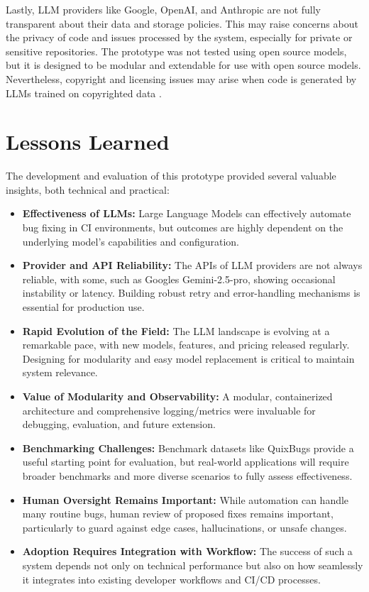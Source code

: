 Lastly, \ac{LLM} providers like Google, OpenAI, and Anthropic are not fully transparent about their data and storage policies. This may raise concerns about the privacy of code and issues processed by the system, especially for private or sensitive repositories. The prototype was not tested using open source models, but it is designed to be modular and extendable for use with open source models. Nevertheless, copyright and licensing issues may arise when code is generated by \acp{LLM} trained on copyrighted data \cite{sauvolaFutureSoftwareDevelopment2024, houLargeLanguageModels2024}.

\section{Lessons Learned}
The development and evaluation of this prototype provided several valuable insights, both technical and practical:

\begin{itemize}
    \item \textbf{Effectiveness of \acp{LLM}:} Large Language Models can effectively automate bug fixing in CI environments, but outcomes are highly dependent on the underlying model's capabilities and configuration.
    \item \textbf{Provider and API Reliability:} The APIs of \ac{LLM} providers are not always reliable, with some, such as Googles Gemini-2.5-pro, showing occasional instability or latency. Building robust retry and error-handling mechanisms is essential for production use.
    \item \textbf{Rapid Evolution of the Field:} The \ac{LLM} landscape is evolving at a remarkable pace, with new models, features, and pricing released regularly. Designing for modularity and easy model replacement is critical to maintain system relevance.
    \item \textbf{Value of Modularity and Observability:} A modular, containerized architecture and comprehensive logging/metrics were invaluable for debugging, evaluation, and future extension.
    \item \textbf{Benchmarking Challenges:} Benchmark datasets like QuixBugs provide a useful starting point for evaluation, but real-world applications will require broader benchmarks and more diverse scenarios to fully assess effectiveness.
    \item \textbf{Human Oversight Remains Important:} While automation can handle many routine bugs, human review of proposed fixes remains important, particularly to guard against edge cases, hallucinations, or unsafe changes.
    \item \textbf{Adoption Requires Integration with Workflow:} The success of such a system depends not only on technical performance but also on how seamlessly it integrates into existing developer workflows and CI/CD processes.
\end{itemize}

